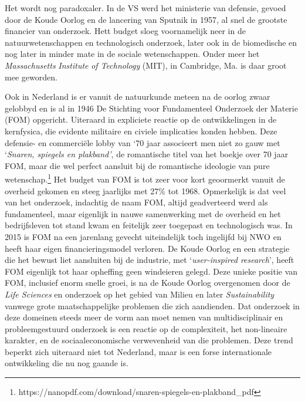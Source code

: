 \documentclass[smallauthor, chapterhaspagenum, nochapterinheader, pagenuminheader,  bigchapnum,medium2, tocpages,  garamond, titleinheader]{jote-book}
\begin{document}
	Het wordt nog paradoxaler. In de VS werd het ministerie van defensie, gevoed door de Koude Oorlog en de lancering van Sputnik in 1957, al snel de grootste financier van onderzoek. Hett budget sloeg voornamelijk neer in de natuurwetenschappen en technologisch onderzoek, later ook in de biomedische en nog later in minder mate in de sociale wetenschappen. Onder meer het \emph{Massachusetts }\emph{Institute}\emph{ of Technology} (MIT), in Cambridge, Ma. is daar groot mee geworden.



	Ook in Nederland is er vanuit de natuurkunde meteen na de oorlog zwaar gelobbyd en is al in 1946 De Stichting voor Fundamenteel Onderzoek der Materie (FOM) opgericht. Uiteraard in expliciete reactie op de ontwikkelingen in de kernfysica, die evidente militaire en civiele implicaties konden hebben. Deze defensie- en commerciële lobby van ‘70 jaar associeert men niet zo gauw met ‘\emph{Snaren, spiegels en plakband'}, de romantische titel van het boekje over 70 jaar FOM, maar die wel perfect aansluit bij de romantische ideologie van pure wetenschap.\footnote{https://nanopdf.com/download/snaren-spiegels-en-plakband\_pdf} Het budget van FOM is tot zeer voor kort geoormerkt vanuit de overheid gekomen en steeg jaarlijks met 27\% tot 1968. Opmerkelijk is dat veel van het onderzoek, indachtig de naam FOM, altijd geadverteerd werd als fundamenteel, maar eigenlijk in nauwe samenwerking met de overheid en het bedrijfsleven tot stand kwam en feitelijk zeer toegepast en technologisch was. In 2015 is FOM na een jarenlang gevecht uiteindelijk toch ingelijfd bij NWO en heeft haar eigen financieringsmodel verloren. De Koude Oorlog en een strategie die het bewust liet aansluiten bij de industrie, met ‘\emph{user-}\emph{inspired}\emph{ research}', heeft FOM eigenlijk tot haar opheffing geen windeieren gelegd. Deze unieke positie van FOM, inclusief enorm snelle groei, is na de Koude Oorlog overgenomen door de \emph{Life Sciences} en onderzoek op het gebied van Milieu en later \emph{Sustainability} vanwege grote maatschappelijke problemen die zich aandienden. Dat onderzoek in deze domeinen steeds meer de vorm aan moet nemen van multidisciplinair en probleemgestuurd onderzoek is een reactie op de complexiteit, het non-lineaire karakter, en de sociaaleconomische verwevenheid van die problemen. Deze trend beperkt zich uiteraard niet tot Nederland, maar is een forse internationale ontwikkeling die nu nog gaande is.
\end{document}
